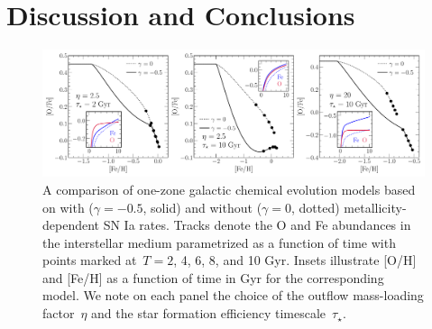 \documentclass[ms.tex]{subfiles}
\begin{document}
\section{Discussion and Conclusions}
\label{sec:conclusions}

\begin{figure}
\centering
\includegraphics[scale = 0.47]{onezone_application.pdf}
\caption{
A comparison of one-zone galactic chemical evolution models based on
\citet[][for details, see their~\S~2]{Johnson2020} with ($\gamma = -0.5$,
solid) and without ($\gamma = 0$, dotted) metallicity-dependent SN Ia rates.
Tracks denote the O and Fe abundances in the interstellar medium parametrized
as a function of time with points marked at~$T = 2$, 4, 6, 8, and 10 Gyr.
Insets illustrate [O/H] and [Fe/H] as a function of time in Gyr for the
corresponding model.
We note on each panel the choice of the outflow mass-loading factor~$\eta$ and
the star formation efficiency timescale~$\tau_\star$.
}
\label{fig:onezone_app}
\end{figure}
\end{document}
